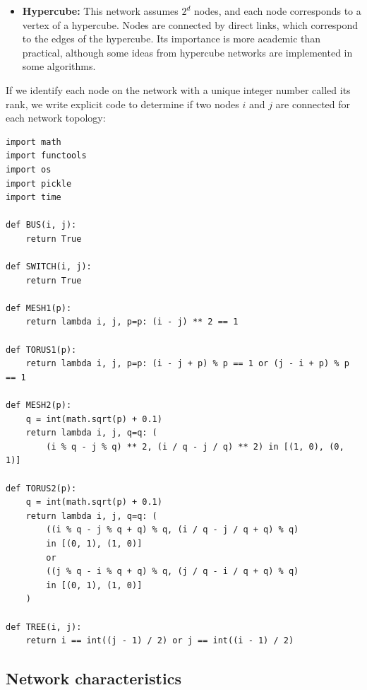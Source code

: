 \documentclass[justified, sixbynine]{tufte-book}
\def\ft{\small\tt}
\theoremstyle{plain}%
\newtheorem * {corollary}{Corollary}
\theoremstyle{definition}
\theoremstyle{remark}
\newtheorem * {remark}{Remark}
\newtheorem * {note}{Note}
\begin{document}
\begin{fullwidth}
\begin{itemize}
Tree networks are ideal for global operations such as broadcasting and for sharing IO devices such as disks. If the IO device is connected to the root node, every other computer can communicate with it using only $\log p$ links (where $p$ is the number of computers connected). Moreover, each subset of a tree network is also a tree network. This makes it easy to distribute subtasks to different subsets of the same architecture.

\item{\bf Hypercube:}
This network assumes $2^d$ nodes, and each node corresponds to a vertex of a hypercube. Nodes are connected by direct links, which correspond to the edges of the hypercube. Its importance is more academic than practical, although some ideas from hypercube networks are implemented in some algorithms.
\end{itemize}

If we identify each node on the network with a unique integer number called its rank, we write explicit code to determine if two nodes $i$ and $j$ are connected for each network topology:


\begin{lstlisting}[caption={in file: {\ft psim.py}}]
import math
import functools
import os
import pickle
import time

def BUS(i, j):
    return True

def SWITCH(i, j):
    return True

def MESH1(p):
    return lambda i, j, p=p: (i - j) ** 2 == 1

def TORUS1(p):
    return lambda i, j, p=p: (i - j + p) % p == 1 or (j - i + p) % p == 1

def MESH2(p):
    q = int(math.sqrt(p) + 0.1)
    return lambda i, j, q=q: (
        (i % q - j % q) ** 2, (i / q - j / q) ** 2) in [(1, 0), (0, 1)]

def TORUS2(p):
    q = int(math.sqrt(p) + 0.1)
    return lambda i, j, q=q: (
        ((i % q - j % q + q) % q, (i / q - j / q + q) % q)
        in [(0, 1), (1, 0)]
        or
        ((j % q - i % q + q) % q, (j / q - i / q + q) % q)
        in [(0, 1), (1, 0)]
    )

def TREE(i, j):
    return i == int((j - 1) / 2) or j == int((i - 1) / 2)
\end{lstlisting}

\goodbreak\subsection{Network characteristics}


\end{fullwidth}
\end{document}
